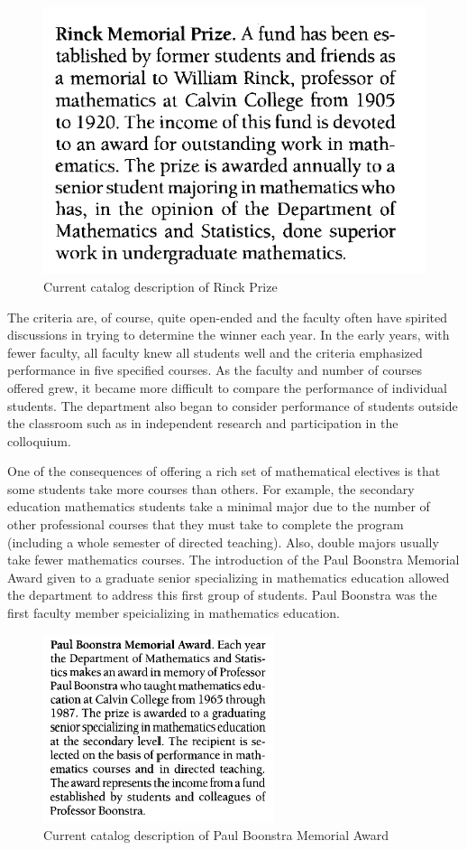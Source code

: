 \documentclass[
]{book}
\begin{document}
\begin{figure}

{\centering \includegraphics[width=0.6\linewidth]{images/Rinck2000} 

}

\caption{Current catalog description of Rinck Prize}\label{fig:Rinck00}
\end{figure}

The criteria are, of course, quite open-ended and the faculty often have spirited discussions in trying to determine the winner each year. In the early years, with fewer faculty, all faculty knew all students well and the criteria emphasized performance in five specified courses. As the faculty and number of courses offered grew, it became more difficult to compare the performance of individual students. The department also began to consider performance of students outside the classroom such as in independent research and participation in the colloquium.

One of the consequences of offering a rich set of mathematical electives is that some students take more courses than others. For example, the secondary education mathematics students take a minimal major due to the number of other professional courses that they must take to complete the program (including a whole semester of directed teaching). Also, double majors usually take fewer mathematics courses. The introduction of the Paul Boonstra Memorial Award given to a graduate senior specializing in mathematics education allowed the department to address this first group of students. Paul Boonstra was the first faculty member speicializing in mathematics education.

\begin{figure}

{\centering \includegraphics[width=0.6\linewidth]{images/Boonstra} 

}

\caption{Current catalog description of Paul Boonstra Memorial Award}\label{fig:Boonstra}
\end{figure}
\end{document}
